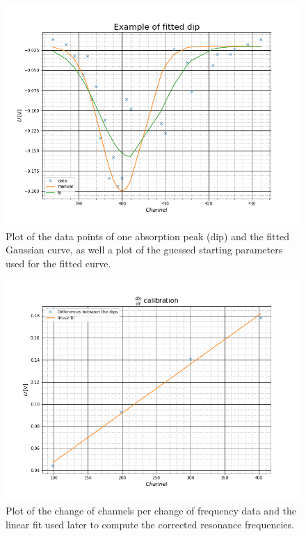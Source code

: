 \begin{figure}[h]
	\includegraphics[scale=0.5]{Bild/dip_dx}
	\centering
	\caption[Plot of one dip for the calibration]{Plot of the data points of one absorption peak (dip) and the fitted Gaussian curve, as well a plot of the guessed starting parameters used for the fitted curve.}
	\label{dip}
\end{figure}

\begin{figure}[h]
	\includegraphics[scale=0.5]{Bild/cali}
	\centering
	\caption[Plot of the calibration fit]{Plot of the change of channels per change of frequency data and the linear fit used later to compute the corrected resonance frequencies.}
	\label{dx/df}
\end{figure}



